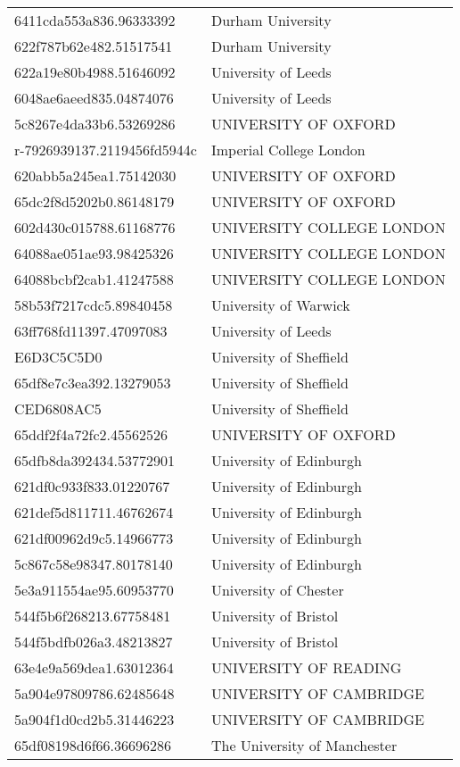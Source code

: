 \begin{tabular}{ll}
6411cda553a836.96333392 & Durham University \\
622f787b62e482.51517541 & Durham University \\
622a19e80b4988.51646092 & University of Leeds \\
6048ae6aeed835.04874076 & University of Leeds \\
5c8267e4da33b6.53269286 & UNIVERSITY OF OXFORD \\
r-7926939137.2119456fd5944c & Imperial College London \\
620abb5a245ea1.75142030 & UNIVERSITY OF OXFORD \\
65dc2f8d5202b0.86148179 & UNIVERSITY OF OXFORD \\
602d430c015788.61168776 & UNIVERSITY COLLEGE LONDON \\
64088ae051ae93.98425326 & UNIVERSITY COLLEGE LONDON \\
64088bcbf2cab1.41247588 & UNIVERSITY COLLEGE LONDON \\
58b53f7217cdc5.89840458 & University of Warwick \\
63ff768fd11397.47097083 & University of Leeds \\
E6D3C5C5D0 & University of Sheffield \\
65df8e7c3ea392.13279053 & University of Sheffield \\
CED6808AC5 & University of Sheffield \\
65ddf2f4a72fc2.45562526 & UNIVERSITY OF OXFORD \\
65dfb8da392434.53772901 & University of Edinburgh \\
621df0c933f833.01220767 & University of Edinburgh \\
621def5d811711.46762674 & University of Edinburgh \\
621df00962d9c5.14966773 & University of Edinburgh \\
5c867c58e98347.80178140 & University of Edinburgh \\
5e3a911554ae95.60953770 & University of Chester \\
544f5b6f268213.67758481 & University of Bristol \\
544f5bdfb026a3.48213827 & University of Bristol \\
63e4e9a569dea1.63012364 & UNIVERSITY OF READING \\
5a904e97809786.62485648 & UNIVERSITY OF CAMBRIDGE \\
5a904f1d0cd2b5.31446223 & UNIVERSITY OF CAMBRIDGE \\
65df08198d6f66.36696286 & The University of Manchester \\

\end{tabular}
